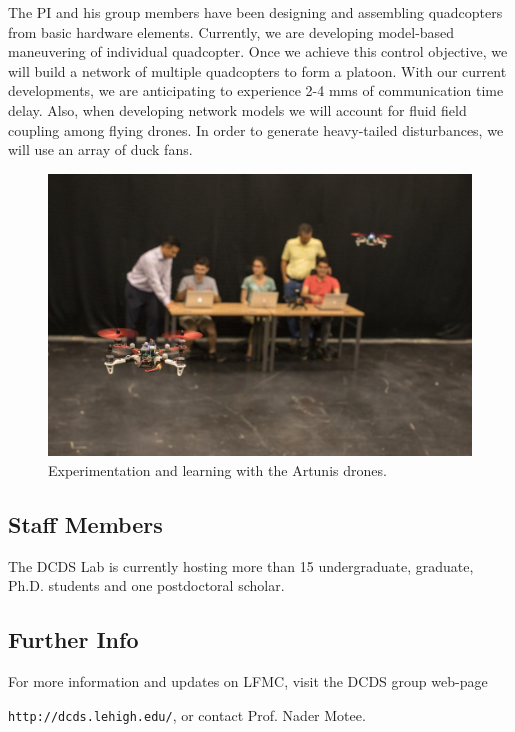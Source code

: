 \documentclass[english,letter,12pt,onesided]{article}
\theoremstyle{definition}
\begin{document}
The PI and his group members have been designing and assembling quadcopters from basic hardware elements. Currently, we are developing model-based maneuvering of individual quadcopter. Once we achieve this control objective, we will build a network of multiple quadcopters to form a platoon. With our current developments, we are anticipating to experience 2-4 mms of communication time delay. Also, when developing network models we will account for fluid field coupling among flying drones. In order to generate heavy-tailed disturbances, we will use an array of duck fans.
 
\begin{figure}[b]
\center
    \includegraphics[width=1\textwidth]{082318} \caption*{Experimentation and learning with the Artunis drones.}
\end{figure}


\subsection*{Staff Members}


The DCDS Lab is currently hosting more than 15 undergraduate, graduate, Ph.D. students and one postdoctoral scholar. 

\subsection*{Further Info}
For more information and updates on LFMC, visit the DCDS group web-page 

 \texttt{http://dcds.lehigh.edu/}, or contact Prof. Nader Motee.
\end{document}
